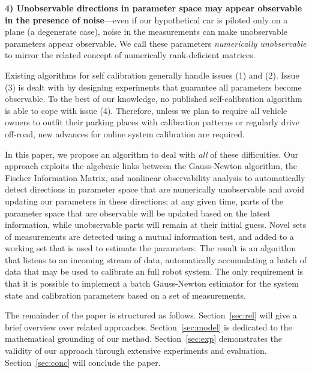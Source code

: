 {\bf 4) Unobservable directions in parameter space may appear observable in the presence of noise}---even if our hypothetical car is piloted only on a plane (a degenerate case), noise in the measurements can make unobservable parameters appear observable. We call these parameters {\em numerically unobservable} to mirror the related concept of numerically rank-deficient matrices. 

Existing algorithms for self calibration generally handle issues (1) and (2). Issue (3) is dealt with by designing experiments that guarantee all parameters become observable. To the best of our knowledge, no published self-calibration algorithm is able to cope with issue (4). Therefore, unless we plan to require all vehicle owners to outfit their parking places with calibration patterns or regularly drive off-road, new advances for online system calibration are required.



In this paper, we propose an algorithm to deal with {\em all} of these difficulties.
Our approach exploits the algebraic links between the Gauss-Newton algorithm, the Fischer Information Matrix, and nonlinear observability analysis to automatically detect directions in parameter space that are numerically unobservable and avoid updating our parameters in these directions; at any given time, parts of the parameter space that are observable will be updated based on the latest information, while unobservable parts will remain at their initial guess. Novel sets of measurements are detected using a mutual information test, and added to a working set that is used to estimate the parameters. The result is an algorithm that listens to an incoming stream of data, automatically accumulating a batch of data that may be used to calibrate an full robot system. The only requirement is that it is possible to implement a batch Gauss-Newton estimator for the system state and calibration parameters based on a set of measurements.



The remainder of the paper is structured as follows. Section~\ref{sec:rel}
will give a brief overview over related approaches. Section~\ref{sec:model} is
dedicated to the mathematical grounding of our method.
Section~\ref{sec:exp} demonstrates the validity of our approach through
extensive experiments and evaluation. Section~\ref{sec:conc} will conclude the
paper.


